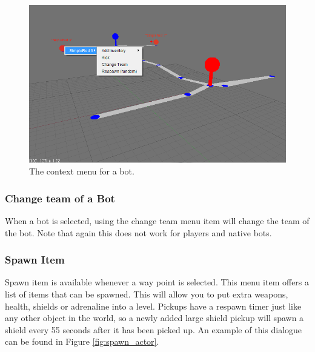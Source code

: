 \documentclass[11pt,a4paper]{article}
\begin{document}
\begin{figure}[h!]
\centering
\includegraphics[width=1.0\textwidth]{images/respawn_bot.png}
\caption{The context menu for a bot.}\label{fig:respawn_actor}
\end{figure}

\subsubsection*{Change team of a Bot}

When a bot is selected, using the change team menu item will change the team of the bot. Note that again this does not work for players and native bots.


%
\subsubsection*{Spawn Item}
%
Spawn item is available whenever a way point is selected. This menu item offers a list of items that can be spawned. This will allow you to put extra weapons, health, shields or adrenaline into a level. Pickups have a respawn timer just like any other object in the world, so a newly added large shield pickup will spawn a shield every 55 seconds after it has been picked up. An example of this dialogue can be found in Figure \ref{fig:spawn_actor}.
\end{document}
